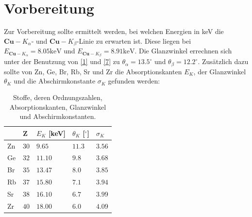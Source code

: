 \documentclass[a4paper]{scrartcl}
\begin{document}
\section{Vorbereitung}
Zur Vorbereitung sollte ermittelt werden, bei welchen Energien in keV die $\mathbf{Cu}-K_{\alpha}$- und $\mathbf{Cu}-K_{\beta}$-Linie zu erwarten ist. Diese liegen bei $E_{\mathbf{Cu}-K_{\alpha}}=8.05 \si{\keV}$ und $E_{\mathbf{Cu}-K_{\beta}}=8.91 \si{\keV}$. Die Glanzwinkel errechnen sich unter der Benutzung von \eqref{1} und \eqref{7} zu $\theta_{\alpha}=13.5^\circ$ und $\theta_{\beta}=12.2^\circ$.
Zusätzlich dazu sollte von Zn, Ge, Br, Rb, Sr und Zr die Absorptionskanten $E_{K}$, der Glanzwinkel $\theta_{K}$ und die Abschirmkonstante $\sigma_{K}$ gefunden werden:
\begin{table}[H]
  \centering
  \begin{tabular}{l|l|l|l|l}
  & Z & $E_{K}$ [keV] & $\theta_{K}$ [$^{\circ}$] & $\sigma_{K}$ \\\hline
  Zn & $30$ & $9.65$ & $11.3$ & $3.56$\\\hline
  Ge & $32$ & $11.10$ & $9.8$ & $3.68$\\\hline
  Br & $35$ & $13.47$ & $8.0$ & $3.85$\\\hline
  Rb & $37$ & $15.80$ & $7.1$ & $3.94$\\\hline
  Sr & $38$ & $16.10$ & $6.7$ & $3.99$\\\hline
  Zr & $40$ & $18.00$ & $6.0$ & $4.09$\\\hline
  \end{tabular}
  \caption{Stoffe, deren Ordnungszahlen, Absorptionskanten, Glanzwinkel und Abschirmkonstanten.}
  \label{tab:1}
\end{table}
\end{document}
